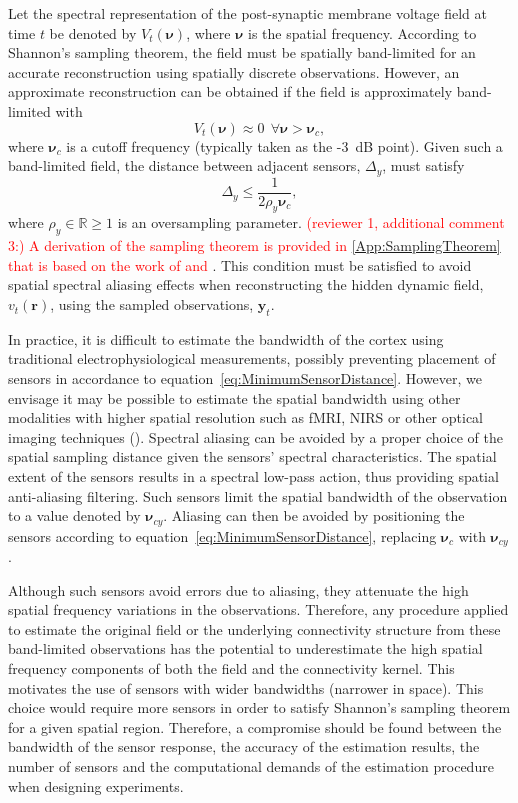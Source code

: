 \documentclass[review,authoryear,3p]{elsarticle}
\newcommand{\dean}[1]{\textcolor{red}{#1}}
\begin{document}
Let the spectral representation of the post-synaptic membrane voltage field at time $t$ be denoted by $V_t(\boldsymbol{\nu})$, where $\boldsymbol\nu$ is the spatial frequency. According to Shannon's sampling theorem, the field must be spatially band-limited for an accurate reconstruction using spatially discrete observations. However, an approximate reconstruction can be obtained if the field is approximately band-limited with 
\begin{equation}
	V_t(\boldsymbol{\nu}) \approx 0 ~ \ \forall \boldsymbol{\nu} > \boldsymbol{\nu}_c,
\end{equation}
where $\boldsymbol{\nu}_c$ is a cutoff frequency (typically taken as the -3~dB point). Given such a band-limited field, the distance between adjacent sensors, $\Delta_y$, must satisfy 
\begin{equation}
	\label{eq:MinimumSensorDistance} \Delta_y \leq \frac{1}{2\rho_y\boldsymbol{\nu}_{c}}, 
\end{equation}
where $\rho_y \in \mathbb{R} \ge 1$ is an oversampling parameter. \dean{(reviewer 1, additional comment 3:) A derivation of the sampling theorem is provided in \ref{App:SamplingTheorem} that is based on the work of \citet{Sanner1992} and \citet{Scerri2009}}. This condition must be satisfied to avoid spatial spectral aliasing effects when reconstructing the hidden dynamic field, $v_t(\mathbf{r})$, using the sampled observations, $\mathbf{y}_t$.

In practice, it is difficult to estimate the bandwidth of the cortex using traditional electrophysiological measurements, possibly preventing placement of sensors in accordance to equation~\ref{eq:MinimumSensorDistance}. However, we envisage it may be possible to estimate the spatial bandwidth using other modalities with higher spatial resolution such as fMRI, NIRS or other optical imaging techniques (\cite{Issa2000}). Spectral aliasing can be avoided by a proper choice of the spatial sampling distance given the sensors' spectral characteristics. The spatial extent of the sensors results in a spectral low-pass action, thus providing spatial anti-aliasing filtering. Such sensors limit the spatial bandwidth of the observation to a value denoted by $\boldsymbol{\nu}_{cy}$. Aliasing can then be avoided by positioning the sensors according to equation~\ref{eq:MinimumSensorDistance}, replacing $\boldsymbol{\nu}_c$ with $\boldsymbol{\nu}_{cy}$.

Although such sensors avoid errors due to aliasing, they attenuate the high spatial frequency variations in the observations. Therefore, any procedure applied to estimate the original field or the underlying connectivity structure from these band-limited observations has the potential to underestimate the high spatial frequency components of both the field and the connectivity kernel. This motivates the use of sensors with wider bandwidths (narrower in space). This choice would require more sensors in order to satisfy Shannon's sampling theorem for a given spatial region. Therefore, a compromise should be found between the bandwidth of the sensor response, the accuracy of the estimation results, the number of sensors and the computational demands of the estimation procedure when designing experiments.
\end{document}
